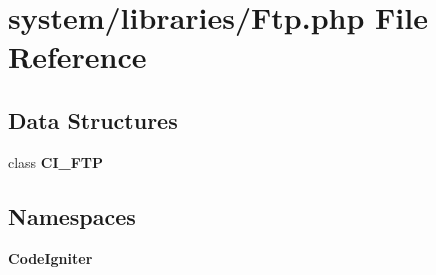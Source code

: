\section{system/libraries/\-Ftp.php File Reference}
\label{_ftp_8php}
\subsection*{Data Structures}
\begin{DoxyCompactItemize}
\item 
class {\bf C\-I\-\_\-\-F\-T\-P}
\end{DoxyCompactItemize}
\subsection*{Namespaces}
\begin{DoxyCompactItemize}
\item 
{\bf Code\-Igniter}
\end{DoxyCompactItemize}
